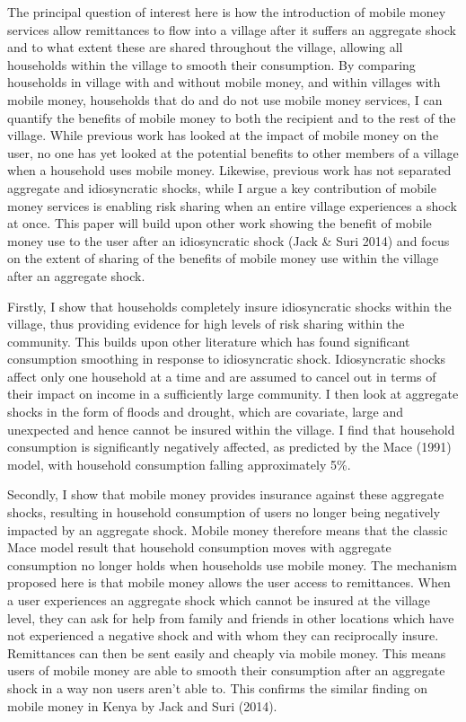 The principal question of interest here is how the introduction of mobile money services allow remittances to flow into a village after it suffers an aggregate shock and to what extent these are shared throughout the village, allowing all households within the village to smooth their consumption. By comparing households in village with and without mobile money, and within villages with mobile money, households that do and do not use mobile money services, I can quantify the benefits of mobile money to both the recipient and to the rest of the village. While previous work has looked at the impact of mobile money on the user, no one has yet looked at the potential benefits to other members of a village when a household uses mobile money. Likewise, previous work has not separated aggregate and idiosyncratic shocks, while I argue a key contribution of mobile money services is enabling risk sharing when an entire village experiences a shock at once. This paper will build upon other work showing the benefit of mobile money use to the user after an idiosyncratic shock (Jack \& Suri 2014) and focus on the extent of sharing of the benefits of mobile money use within the village after an aggregate shock. 
 
Firstly, I show that households completely insure idiosyncratic shocks within the village, thus providing evidence for high levels of  risk sharing within the community. This builds upon other literature which has found significant consumption smoothing in response to idiosyncratic shock. Idiosyncratic shocks affect only one household at a time and are assumed to cancel out in terms of their impact on income in a sufficiently large community. I then look at aggregate shocks in the form of floods and drought, which are covariate, large and unexpected and hence cannot be insured within the village. I find that household consumption is significantly negatively affected, as predicted by the Mace (1991) model, with household consumption falling approximately 5\%.  

Secondly, I show that mobile money provides insurance against these aggregate shocks, resulting in household consumption of users no longer being negatively impacted by an aggregate shock. Mobile money therefore means that the classic Mace model result that household consumption moves with aggregate consumption no longer holds when households use mobile money. The mechanism proposed here is that mobile money allows the user access to remittances. When a user experiences an aggregate shock which cannot be insured at the village level, they can ask for help from family and friends in other locations which have not experienced a negative shock and with whom they can reciprocally insure. Remittances can then be sent easily and cheaply via mobile money. This means users of mobile money are able to smooth their consumption after an aggregate shock in a way non users aren't able to. This confirms the similar finding on mobile money in Kenya by Jack and Suri (2014).   

